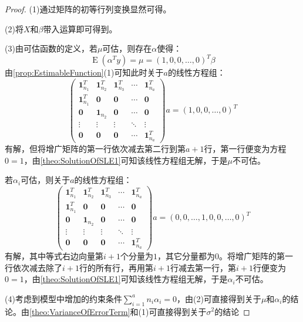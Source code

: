 \begin{proof}
	(1)通过矩阵的初等行列变换显然可得。\par
	(2)将$X$和$\beta$带入运算即可得到。\par
	(3)由可估函数的定义，若$\mu$可估，则存在$\alpha$使得：
	\begin{equation*}
		\operatorname{E}(\alpha^Ty)=\mu=(1,0,0,\dots,0)^T\beta
	\end{equation*}
	由\cref{prop:EstimableFunction}(1)可知此时关于$a$的线性方程组：
	\begin{equation*}
		\begin{pmatrix}
			\mathbf{1}_{n_1}^T & \mathbf{1}_{n_2}^T & \mathbf{1}_{n_3}^T & \cdots & \mathbf{1}_{n_a}^T \\
			\mathbf{1}_{n_1}^T & \mathbf{0} & \mathbf{0} & \cdots & \mathbf{0} \\
			\mathbf{0} & \mathbf{1}_{n_2} & \mathbf{0} & \cdots & \mathbf{0} \\
			\vdots & \vdots & \vdots & \ddots & \vdots \\
			\mathbf{0} & \mathbf{0} & \mathbf{0} & \cdots & \mathbf{1}_{n_a}^T
		\end{pmatrix}a=(1,0,0,\dots,0)^T
	\end{equation*}
	有解，但将增广矩阵的第一行依次减去第二行到第$a+1$行，第一行便变为方程$0=1$，由\cref{theo:SolutionOfSLE1}可知该线性方程组无解，于是$\mu$不可估。\par
	若$\alpha_i$可估，则关于$a$的线性方程组：
	\begin{equation*}
		\begin{pmatrix}
			\mathbf{1}_{n_1}^T & \mathbf{1}_{n_2}^T & \mathbf{1}_{n_3}^T & \cdots & \mathbf{1}_{n_a}^T \\
			\mathbf{1}_{n_1}^T & \mathbf{0} & \mathbf{0} & \cdots & \mathbf{0} \\
			\mathbf{0} & \mathbf{1}_{n_2} & \mathbf{0} & \cdots & \mathbf{0} \\
			\vdots & \vdots & \vdots & \ddots & \vdots \\
			\mathbf{0} & \mathbf{0} & \mathbf{0} & \cdots & \mathbf{1}_{n_a}^T
		\end{pmatrix}a=(0,0,\dots,1,0,0,\dots,0)^T
	\end{equation*}
	有解，其中等式右边向量第$i+1$个分量为$1$，其它分量都为$0$。将增广矩阵的第一行依次减去除了$i+1$行的所有行，再用第$i+1$行减去第一行，第$i+1$行便变为$0=1$，由\cref{theo:SolutionOfSLE1}可知该线性方程组无解，于是$\alpha_i$不可估。\par
	(4)考虑到模型中增加的约束条件$\sum\limits_{i=1}^{a}n_i\alpha_i=0$，由(2)可直接得到关于$\mu$和$\alpha_i$的结论。由\cref{theo:VarianceOfErrorTerm}和(1)可直接得到关于$\sigma^2$的结论\par

\end{proof}
